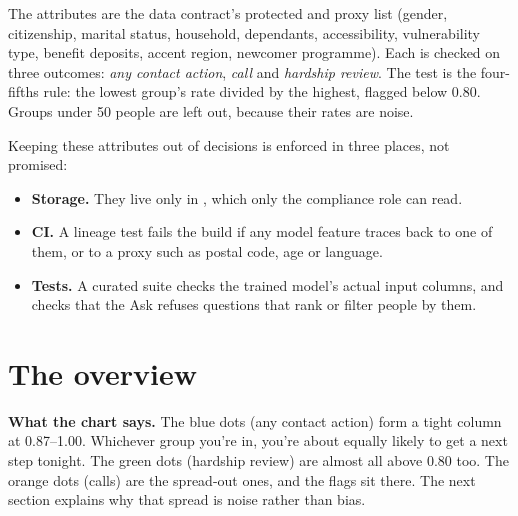 \documentclass[11pt]{article}
\begin{document}
The attributes are the data contract's protected and proxy list (gender, citizenship, marital status, household,
dependants, accessibility, vulnerability type, benefit deposits, accent region, newcomer programme). Each is checked on
three outcomes: \emph{any contact action}, \emph{call} and \emph{hardship review}. The test is the four-fifths rule: the
lowest group's rate divided by the highest, flagged below 0.80. Groups under 50 people are left out, because their rates are
noise.

Keeping these attributes out of decisions is enforced in three places, not promised:
\begin{itemize}
\item \textbf{Storage.} They live only in , which only the compliance role can read.
\item \textbf{CI.} A lineage test fails the build if any model feature traces back to one of them, or to a proxy such as postal
code, age or language.
\item \textbf{Tests.} A curated suite checks the trained model's actual input columns, and checks that the Ask refuses
questions that rank or filter people by them.
\end{itemize}

\section{The overview}


\textbf{What the chart says.} The blue dots (any contact action) form a tight column at 0.87–1.00. Whichever group
you're in, you're about equally likely to get a next step tonight. The green dots (hardship review) are almost all
above 0.80 too. The orange dots (calls) are the spread-out ones, and the flags sit there. The next section explains why
that spread is noise rather than bias.
\end{document}
